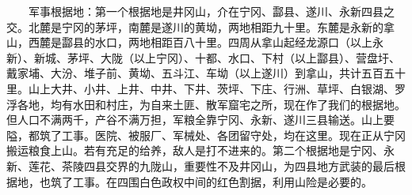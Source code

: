 \documentclass[cn,11pt,chinese]{elegantbook}
\begin{document}
　　军事根据地：第一个根据地是井冈山，介在宁冈、酃县、遂川、永新四县之交。北麓是宁冈的茅坪，南麓是遂川的黄坳，两地相距九十里。东麓是永新的拿山，西麓是酃县的水口，两地相距百八十里。四周从拿山起经龙源口（以上永新）、新城、茅坪、大陇（以上宁冈）、十都、水口、下村（以上酃县）、营盘圩、戴家埔、大汾、堆子前、黄坳、五斗江、车坳（以上遂川）到拿山，共计五百五十里。山上大井、小井、上井、中井、下井、茨坪、下庄、行洲、草坪、白银湖、罗浮各地，均有水田和村庄，为自来土匪、散军窟宅之所，现在作了我们的根据地。但人口不满两千，产谷不满万担，军粮全靠宁冈、永新、遂川三县输送。山上要隘，都筑了工事。医院、被服厂、军械处、各团留守处，均在这里。现在正从宁冈搬运粮食上山。若有充足的给养，敌人是打不进来的。第二个根据地是宁冈、永新、莲花、茶陵四县交界的九陇山，重要性不及井冈山，为四县地方武装的最后根据地，也筑了工事。在四围白色政权中间的红色割据，利用山险是必要的。\\
\end{document}
